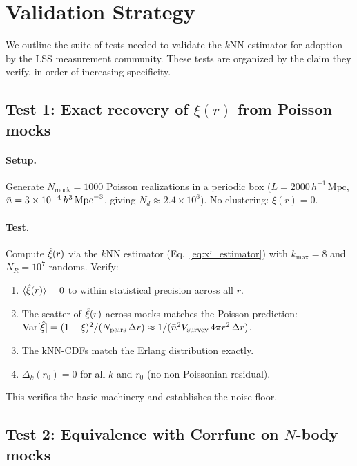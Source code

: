 \section{Validation Strategy}
\label{sec:validation}

We outline the suite of tests needed to validate the $k$NN estimator for adoption by the LSS measurement community.  These tests are organized by the claim they verify, in order of increasing specificity.

\subsection{Test 1: Exact recovery of $\xi(r)$ from Poisson mocks}
\label{sec:test_poisson}

\paragraph{Setup.}  Generate $N_{\mathrm{mock}} = 1000$ Poisson realizations in a periodic box ($L = 2000\,h^{-1}\,\mathrm{Mpc}$, $\bar{n} = 3 \times 10^{-4}\,h^3\,\mathrm{Mpc}^{-3}$, giving $N_d \approx 2.4 \times 10^6$).  No clustering: $\xi(r) = 0$.

\paragraph{Test.}  Compute $\hat{\xi}(r)$ via the $k$NN estimator (Eq.~\ref{eq:xi_estimator}) with $k_{\max} = 8$ and $N_R = 10^7$ randoms.  Verify:
\begin{enumerate}[nosep]
  \item $\langle\hat{\xi}(r)\rangle = 0$ to within statistical precision across all $r$.
  \item The scatter of $\hat{\xi}(r)$ across mocks matches the Poisson prediction: $\mathrm{Var}[\hat{\xi}] = (1 + \xi)^2 / (N_{\rm pairs}\,\Delta r) \approx 1/(\bar{n}^2 V_{\rm survey}\,4\pi r^2\,\Delta r)$.
  \item The kNN-CDFs match the Erlang distribution exactly.
  \item $\Delta_k(r_0) = 0$ for all $k$ and $r_0$ (no non-Poissonian residual).
\end{enumerate}
This verifies the basic machinery and establishes the noise floor.

\subsection{Test 2: Equivalence with Corrfunc on $N$-body mocks}
\label{sec:test_corrfunc}

